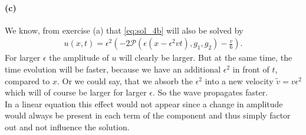 \paragraph{(c)}
We know, from exercise (a) that \cref{eq:sol_4b} will also be solved by
\begin{align}
u(x,t)=\epsilon^2\left(-2\mathscr{P}(\epsilon\left( x-\epsilon^2v t\right), g_1,g_2)-\frac{v}{6}\right).
\end{align}
For larger $\epsilon$ the amplitude of $u$ will clearly be larger. But at the same time, the time evolution will be faster, because we have an additional $\epsilon^2$ in front of $t$, compared to $x$. Or we could say, that we absorb the $\epsilon^2$ into a new velocity $\tilde{v}=v\epsilon^2$ which will of course be larger for larger $\epsilon$. So the wave propagates faster.\\
In a linear equation this effect would not appear since a change in amplitude would always be present in each term of the component and thus simply factor out and not influence the solution. 
